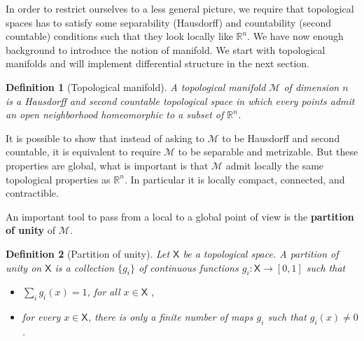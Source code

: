 \documentclass[10pt]{book}
\newcommand{\Mcal}{\mathcal{M}}
\newcommand{\Rbb}{\mathbb{R}}
\newcommand{\Xsf}{\mathsf{X}}
\theoremstyle{break}
\newtheorem{lemma}{Lemma}
\newtheorem{definition}{Definition}
\begin{document}



%
%


In order to restrict ourselves to a less general picture, we require that topological spaces has to satisfy some separability (Hausdorff) and countability (second countable) conditions such that they look locally like $\Rbb^n$. We have now enough background to introduce the notion of manifold. We start with topological manifolds and will implement differential structure in the next section.%


\begin{definition}[Topological manifold]
A topological manifold $\Mcal$ of dimension $n$ is a Hausdorff and second countable topological space in which every points admit an open neighborhood homeomorphic to a subset of $\Rbb^n$.
\end{definition}


It is possible to show that instead of asking to $\Mcal$ to be Hausdorff and second countable, it is equivalent to require $\Mcal$ to be separable and metrizable. But these properties are global, what is important is that $\Mcal$ admit locally the same topological properties as $\Rbb^n$. In particular it is locally compact, connected, and contractible.%


\bigskip


An important tool to pass from a local to a global point of view is the \textbf{partition of unity} of $\Mcal$. 


\begin{definition}[Partition of unity]


Let $\Xsf$ be a topological space. A partition of unity on $\Xsf$ is a collection $\{g_i\}$ of continuous functions $g_i : \Xsf \to [0,1]$ such that
%
\begin{itemize}
\item $\sum_i g_i(x) = 1$, for all $x \in \Xsf$ ,
\item for every $x \in \Xsf$, there is only a finite number of maps $g_i$ such that $g_i(x) \neq 0$.
\end{itemize}
%
\end{definition}
\end{document}
